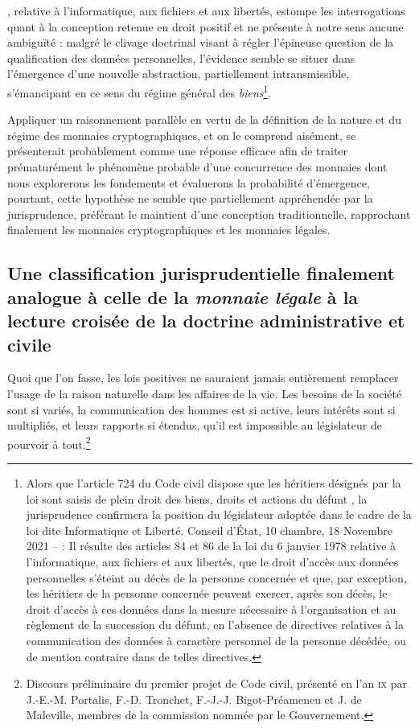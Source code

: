 {{}, relative à l'informatique, aux fichiers et aux libertés, estompe les interrogations quant à la conception retenue en droit positif et ne présente à notre sens aucune ambiguïté : malgré le clivage doctrinal visant à régler l'épineuse question de la qualification des données personnelles, l'évidence semble se situer dans l'émergence d'une nouvelle abstraction, partiellement intransmissible, s'émancipant en ce sens du régime général des \emph{biens}\footnote{Alors que l'article 724 du Code civil dispose que \og les héritiers désignés par la loi sont saisis de plein droit des biens, droits et actions du défunt \fg, la jurisprudence confirmera la position du législateur adoptée dans le cadre de la loi dite \og Informatique et Liberté\fg{}. Conseil d'État, 10 chambre, 18 Novembre 2021 –  : \og Il résulte des articles 84 et 86 de la loi du 6 janvier 1978 relative à l'informatique, aux fichiers et aux libertés, que le droit d'accès aux données personnelles s'éteint au décès de la personne concernée et que, par exception, les héritiers de la personne concernée peuvent exercer, après son décès, le droit d'accès à ces données dans la mesure nécessaire à l'organisation et au règlement de la succession du défunt, en l'absence de directives relatives à la communication des données à caractère personnel de la personne décédée, ou de mention contraire dans de telles directives\fg{}.}.\par

Appliquer un raisonnement parallèle en vertu de la définition de la nature et du régime des monnaies cryptographiques, et on le comprend aisément, se présenterait probablement comme une réponse efficace afin de traiter prématurément le phénomène probable d'une concurrence des monnaies dont nous explorerons les fondements et évaluerons la probabilité d'émergence, pourtant, cette hypothèse ne semble que partiellement appréhendée par la jurisprudence, préférant le maintient d'une conception traditionnelle, rapprochant finalement les monnaies cryptographiques et les monnaies légales.
\par 

\subsection{Une classification jurisprudentielle finalement analogue à celle de la \emph{monnaie légale} à la lecture croisée de la doctrine administrative et civile}

\og Quoi que l'on fasse, les lois positives ne sauraient jamais entièrement remplacer l'usage de la raison naturelle dans les affaires de la vie. Les besoins de la société sont si variés, la communication des hommes est si active, leurs intérêts sont si multipliés, et leurs rapports si étendus, qu'il est impossible au législateur de pourvoir à tout\fg{}.\footnote{Discours préliminaire du premier projet de Code civil, présenté en l'an \textsc{ix} par J.-E.-M. Portalis, F.-D. Tronchet, F.-J.-J. Bigot-Préameneu et J. de Maleville, membres de la commission nommée par le Gouvernement.}\par

}
